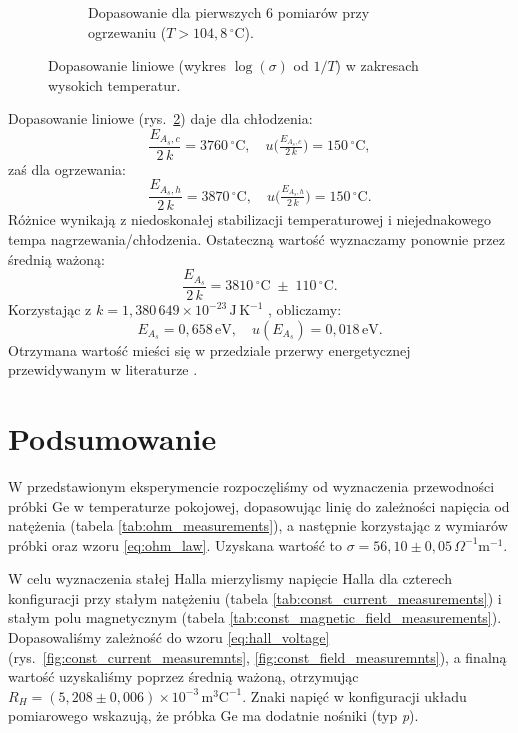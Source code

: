 \documentclass[12pt]{article}
\begin{document}
\begin{figure}[H]
\begin{subfigure}[b]{0.45\textwidth}
    \caption{Dopasowanie dla pierwszych 6 pomiarów przy ogrzewaniu ($T>104{,}8\,^\circ\mathrm{C}$).}
    \label{fig:temp_heating_fit}
  \end{subfigure}
  \caption{Dopasowanie liniowe (wykres $\log(\sigma)$ od $1/T$) w zakresach wysokich temperatur.}
  \label{fig:temp_fits}
\end{figure}

Dopasowanie liniowe (rys.~\ref{fig:temp_fits}) daje dla chłodzenia:
\begin{equation}
    \frac{E_{A_s,c}}{2\,k} = 3760\,^\circ\mathrm{C}, \quad u\!\bigl(\tfrac{E_{A_s,c}}{2\,k}\bigr) = 150\,^\circ\mathrm{C},
    \label{eq:temp_cooling_fit}
\end{equation}
zaś dla ogrzewania:
\begin{equation}
    \frac{E_{A_s,h}}{2\,k} = 3870\,^\circ\mathrm{C}, \quad u\!\bigl(\tfrac{E_{A_s,h}}{2\,k}\bigr) = 150\,^\circ\mathrm{C}.
    \label{eq:temp_heating_fit}
\end{equation}
Różnice wynikają z niedoskonałej stabilizacji temperaturowej i niejednakowego tempa nagrzewania/chłodzenia. Ostateczną wartość wyznaczamy ponownie przez średnią ważoną:
\begin{equation}
    \frac{E_{A_s}}{2\,k} = 3810\,^\circ\mathrm{C} \;\pm\; 110\,^\circ\mathrm{C}.
    \label{eq:final_cof}
\end{equation}
Korzystając z $k=1{,}380\,649\times 10^{-23}\,\mathrm{J\,K}^{-1}$ \cite{boltzman}, obliczamy:
\[
    E_{A_s} = 0{,}658\,\mathrm{eV}, 
    \quad 
    u(E_{A_s}) = 0{,}018\,\mathrm{eV}.
\]
Otrzymana wartość mieści się w przedziale przerwy energetycznej przewidywanym w literaturze \cite{band_gap}.

\newpage
\section{Podsumowanie}
W przedstawionym eksperymencie rozpoczęliśmy od wyznaczenia przewodności próbki Ge w temperaturze pokojowej, dopasowując linię do zależności napięcia od natężenia (tabela \ref{tab:ohm_measurements}), a następnie korzystając z wymiarów próbki oraz wzoru \eqref{eq:ohm_law}. Uzyskana wartość to $\sigma = 56{,}10 \pm 0{,}05\,\Omega^{-1}\mathrm{m}^{-1}$.

W celu wyznaczenia stałej Halla mierzylismy napięcie Halla dla czterech konfiguracji przy stałym natężeniu (tabela \ref{tab:const_current_measurements}) i stałym polu magnetycznym (tabela \ref{tab:const_magnetic_field_measurements}). Dopasowaliśmy zależność do wzoru \eqref{eq:hall_voltage} (rys.~\ref{fig:const_current_measuremnts}, \ref{fig:const_field_measuremnts}), a finalną wartość uzyskaliśmy poprzez średnią ważoną, otrzymując $R_H = (5{,}208 \pm 0{,}006)\times 10^{-3}\,\mathrm{m}^3\mathrm{C}^{-1}$. Znaki napięć w konfiguracji układu pomiarowego wskazują, że próbka Ge ma dodatnie nośniki (typ \emph{p}). 
\end{document}
